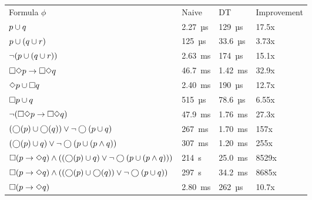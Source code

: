 \begin{table}[!ht]
    \centering
    \makeatletter
           \def\rulecolor#1#{\CT@arc{#1}}
           \def\CT@arc#1#2{%
           \ifdim\baselineskip=\z@\noalign\fi
           {\gdef\CT@arc@{\color#1{#2}}}}
           \let\CT@arc@\relax
        \makeatother
    \begin{tabular}{@{}llll@{}}
        \toprule
        Formula $\phi$ & Naive & DT & Improvement \\ 
        \cmidrule(r){1-1}\cmidrule(lr){2-2}\cmidrule(lr){3-3}\cmidrule(l){4-4}
        $p \cup q$                                                                                    & 2.27~µs    & 129~µs     & 17.5x \\
        $p \cup (q \cup r)$                                                                             & 125~µs     & 33.6~µs    & 3.73x \\
        $\lnot(p \cup (q \cup r))$                                                                      & 2.63~ms    & 174~µs     & 15.1x \\
        $\square \Diamond p \rightarrow \square \Diamond q$                                                                    & 46.7~ms    & 1.42~ms    & 32.9x \\
        $\Diamond  p \cup \square q$                                                                             & 2.40~ms    & 190~µs     & 12.7x \\
        \midrule
        $\square  p \cup q$                                                                                & 515~µs     & 78.6~µs    & 6.55x \\
        $\lnot(\square \Diamond p \rightarrow \square \Diamond q)$                                                             & 47.9~ms    & 1.76~ms    & 27.3x \\
        $(\bigcirc (p) \cup \bigcirc (q)) \lor \lnot \bigcirc (p \cup q)$                                                 & 267~ms     & 1.70~ms    & 157x \\
        $(\bigcirc (p) \cup q) \lor \lnot \bigcirc (p \cup (p \land q))$                                            & 307~ms     & 1.20~ms    & 255x \\
        $\square  (p \rightarrow \Diamond  q) \land ((\bigcirc (p) \cup q) \lor \lnot \bigcirc (p \cup (p \land q)))$               & 214~s      & 25.0~ms    & 8529x \\
        \midrule
        $\square  (p \rightarrow \Diamond  q) \land ((\bigcirc (p) \cup \bigcirc (q)) \lor \lnot \bigcirc (p \cup q))$                    & 297~s      & 34.2~ms    & 8685x \\
        $\square  (p \rightarrow \Diamond  q)$                                                                      & 2.80~ms    & 262~µs     & 10.7x \\

\end{tabular}
\end{table}
